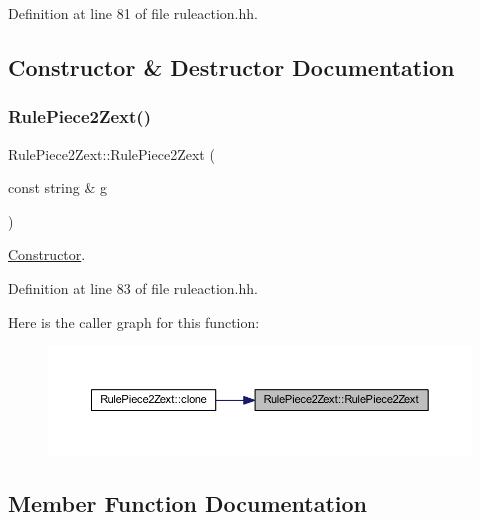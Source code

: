 Definition at line 81 of file ruleaction.\+hh.



\subsection{Constructor \& Destructor Documentation}
\mbox{\label{class_rule_piece2_zext_ac5cc0b69e54bb029f0ca6a425f88289f}} 
\subsubsection{\texorpdfstring{RulePiece2Zext()}{RulePiece2Zext()}}
{\footnotesize\ttfamily Rule\+Piece2\+Zext\+::\+Rule\+Piece2\+Zext (\begin{DoxyParamCaption}\item[{const string \&}]{g }\end{DoxyParamCaption})\hspace{0.3cm}{\ttfamily [inline]}}



\mbox{\hyperlink{class_constructor}{Constructor}}. 



Definition at line 83 of file ruleaction.\+hh.

Here is the caller graph for this function\+:
\nopagebreak
\begin{figure}[H]
\begin{center}
\leavevmode
\includegraphics[width=350pt]{class_rule_piece2_zext_ac5cc0b69e54bb029f0ca6a425f88289f_icgraph}
\end{center}
\end{figure}


\subsection{Member Function Documentation}
\mbox{\label{class_rule_piece2_zext_aa879d79ce26d031791b5ae7a11908701}} 
